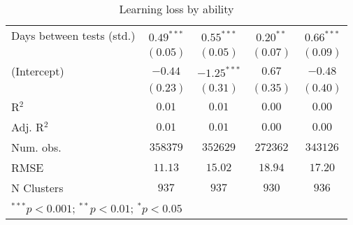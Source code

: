\begin{table}
\begin{center}
\begin{tabular}{l c c c c}
Days between tests (std.)    & $0.49^{***}$  & $0.55^{***}$  & $0.20^{**}$   & $0.66^{***}$  \\
                             & $(0.05)$      & $(0.05)$      & $(0.07)$      & $(0.09)$      \\
(Intercept)                  & $-0.44$       & $-1.25^{***}$ & $0.67$        & $-0.48$       \\
                             & $(0.23)$      & $(0.31)$      & $(0.35)$      & $(0.40)$      \\
\hline
R$^2$                        & $0.01$        & $0.01$        & $0.00$        & $0.00$        \\
Adj. R$^2$                   & $0.01$        & $0.01$        & $0.00$        & $0.00$        \\
Num. obs.                    & $358379$      & $352629$      & $272362$      & $343126$      \\
RMSE                         & $11.13$       & $15.02$       & $18.94$       & $17.20$       \\
N Clusters                   & $937$         & $937$         & $930$         & $936$         \\
\hline
\multicolumn{5}{l}{\scriptsize{$^{***}p<0.001$; $^{**}p<0.01$; $^{*}p<0.05$}}
\end{tabular}
\caption{Learning loss by ability}
\label{tableability}
\end{center}
\end{table}
